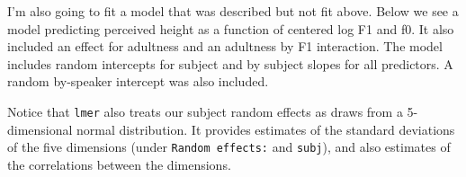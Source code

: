 \documentclass[
]{book}
\newenvironment{Shaded}{\begin{snugshade}}{\end{snugshade}}
\newcommand{\AttributeTok}[1]{\textcolor[rgb]{0.77,0.63,0.00}{#1}}
\newcommand{\CommentTok}[1]{\textcolor[rgb]{0.56,0.35,0.01}{\textit{#1}}}
\newcommand{\DecValTok}[1]{\textcolor[rgb]{0.00,0.00,0.81}{#1}}
\newcommand{\FunctionTok}[1]{\textcolor[rgb]{0.00,0.00,0.00}{#1}}
\newcommand{\NormalTok}[1]{#1}
\newcommand{\OtherTok}[1]{\textcolor[rgb]{0.56,0.35,0.01}{#1}}
\newcommand{\SpecialCharTok}[1]{\textcolor[rgb]{0.00,0.00,0.00}{#1}}
\newcommand{\StringTok}[1]{\textcolor[rgb]{0.31,0.60,0.02}{#1}}
\begin{document}
I'm also going to fit a model that was described but not fit above. Below we see a model predicting perceived height as a function of centered log F1 and f0. It also included an effect for adultness and an adultness by F1 interaction. The model includes random intercepts for subject and by subject slopes for all predictors. A random by-speaker intercept was also included.

\begin{Shaded}
\end{Shaded}

Notice that \texttt{lmer} also treats our subject random effects as draws from a 5-dimensional normal distribution. It provides estimates of the standard deviations of the five dimensions (under \texttt{Random\ effects:} and \texttt{subj}), and also estimates of the correlations between the dimensions.
\end{document}
